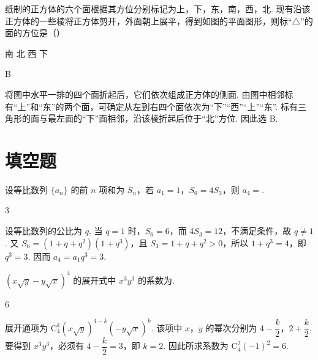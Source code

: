 \begin{problem}
纸制的正方体的六个面根据其方位分别标记为上，下，东，南，西，北. 现有沿该正方体的一些棱将正方体剪开，外面朝上展平，得到如图的平面图形，则标“\(\triangle\)”的面的方位是（\quad）


\choices
    {南}
    {北}
    {西}
    {下}
\end{problem}

\begin{answer}
B
\end{answer}

\begin{solution}
将图中水平一排的四个面折起后，它们依次组成正方体的侧面. 由图中相邻标有“上”和“东”的两个面，可确定从左到右四个面依次为“下”“西”“上”“东”. 标有三角形的面与最左面的“下”面相邻，沿该棱折起后位于“北”方位. 因此选 B.
\end{solution}

\section{填空题}

\begin{problem}
设等比数列 \(\{a_{n}\}\) 的前 \(n\) 项和为 \(S_{n}\)，若 \(a_{1} = 1\)，\(S_{6} = 4S_{3}\)，则 \(a_{4} = \)\fillinblank{}.
\end{problem}

\begin{answer}
\(3\)
\end{answer}

\begin{solution}
设等比数列的公比为 \(q\). 当 \(q=1\) 时，\(S_6=6\)，而 \(4S_3=12\)，不满足条件，故 \(q\neq1\). 又 \(S_6=(1+q+q^2)(1+q^3)\)，且 \(S_3=1+q+q^2>0\)，所以 \(1+q^3=4\)，即 \(q^3=3\). 因而 \(a_4=a_1q^3=3\).
\end{solution}

\begin{problem}
\(\left(x\sqrt{y} - y\sqrt{x}\right)^4\) 的展开式中 \(x^3 y^3\) 的系数为\fillinblank{}.
\end{problem}

\begin{answer}
\(6\)
\end{answer}

\begin{solution}
展开通项为 \(\mathrm C_4^k\left(x\sqrt y\right)^{4-k}\left(-y\sqrt x\right)^k\). 该项中 \(x\)，\(y\) 的幂次分别为 \(4-\dfrac k2\)，\(2+\dfrac k2\). 要得到 \(x^3y^3\)，必须有 \(4-\dfrac k2=3\)，即 \(k=2\). 因此所求系数为 \(\mathrm C_4^2(-1)^2=6\).
\end{solution}

